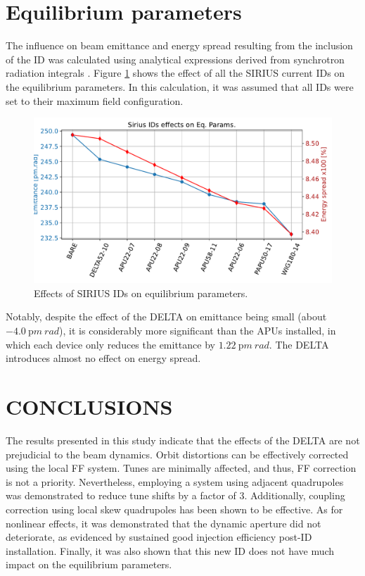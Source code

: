 \documentclass[a4paper,
               keeplastbox,   %
               ]{jacow}
\begin{document}
\section{Equilibrium parameters}
The influence on beam emittance and energy spread resulting from the inclusion of the ID was calculated using analytical expressions derived from synchrotron radiation integrals \cite{Lee:1999}. Figure \ref{fig:eq_param} shows the effect of all the SIRIUS current IDs on the equilibrium parameters. In this calculation, it was assumed that all IDs were set to their maximum field configuration.

\begin{figure}[!h]
    \centering
   \includegraphics[width=\columnwidth]{eqparams.pdf}
   \caption{Effects of SIRIUS IDs on equilibrium parameters.}
   \label{fig:eq_param}
\end{figure}

Notably, despite the effect of the DELTA on emittance being small (about $\SI{-4.0}{\pico m~rad}$), it is considerably more significant than the APUs installed, in which each device only reduces the emittance by $\SI{1.22}{\pico m~rad}$. The DELTA introduces almost no effect on energy spread.

\section{CONCLUSIONS}

The results presented in this study indicate that the effects of the DELTA are not prejudicial to the beam dynamics. Orbit distortions can be effectively corrected using the local FF system. Tunes are minimally affected, and thus, FF correction is not a priority. Nevertheless, employing a system using adjacent quadrupoles was demonstrated to reduce tune shifts by a factor of 3. Additionally, coupling correction using local skew quadrupoles has been shown to be effective. As for nonlinear effects, it was demonstrated that the dynamic aperture did not deteriorate, as evidenced by sustained good injection efficiency post-ID installation.
Finally, it was also shown that this new ID does not have much impact on the equilibrium parameters. 
\end{document}
